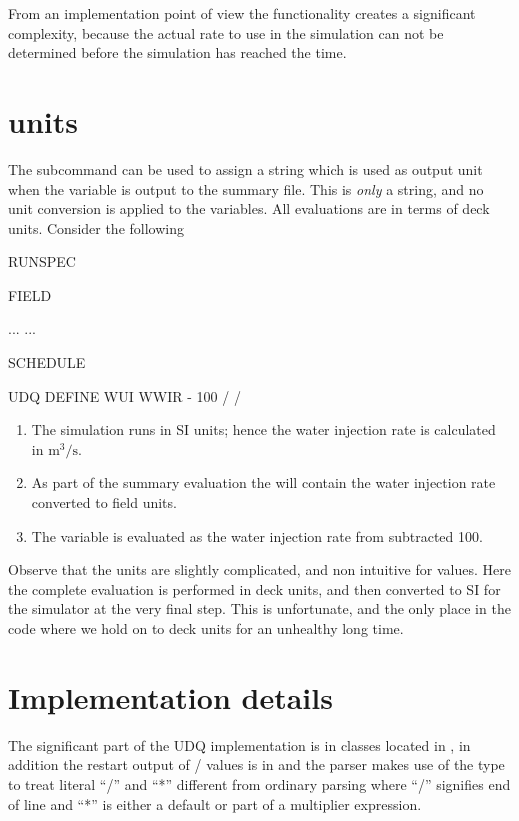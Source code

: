 From an implementation point of view the  functionality creates a
significant complexity, because the actual rate to use in the simulation can not
be determined before the simulation has reached the time.


\section{\udq{} units}
\label{udq_units}
The \udq{} subcommand  can be used to assign a string which is used as
output unit when the \udq{} variable is output to the summary file. This is
\emph{only} a string, and no unit conversion is applied to the \udq{} variables.
All \udq{} evaluations are in terms of deck units. Consider the following
\begin{deck}
RUNSPEC

FIELD

...
...

SCHEDULE

UDQ
  DEFINE WUI WWIR - 100 /
/
\end{deck}

\begin{enumerate}
\item The simulation runs in SI units; hence the water injection rate is
  calculated in $\mathrm{m^3/s}$.
\item As part of the summary evaluation the  will
  contain the water injection rate converted to field units.
\item The \udq{} variable  is evaluated as the water injection rate from
   subtracted 100.
\end{enumerate}

Observe that the units are slightly complicated, and non intuitive for 
values. Here the complete evaluation is performed in deck units, and then
converted to SI for the simulator at the very final step. This is unfortunate,
and the only place in the code where we hold on to deck units for an unhealthy
long time.


\section{Implementation details}
The significant part of the UDQ implementation is in classes located in
, in addition the restart output of
\udq{}/ values is in  and
the \udq{} parser makes use of the type  to treat literal
``/'' and ``*'' different from ordinary parsing where ``/'' signifies end of
line and ``*'' is either a default or part of a multiplier expression.

